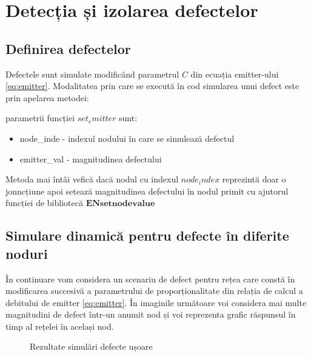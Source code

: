 \chapter{Detecția și izolarea defectelor}
\label{chap:detectie}
\section{Definirea defectelor}
Defectele sunt simulate modificând parametrul $C$ din ecuația emitter-ului \eqref{eq:emitter}. Modalitatea prin care se execută în cod simularea unui defect este prin apelarea metodei:



parametrii funcției $set_emitter$ sunt:
\begin{itemize}
\item node\_inde - indexul nodului în care se simulează defectul
\item emitter\_val - magnitudinea defectului
\end{itemize}

Metoda mai întâi vefică dacă nodul cu indexul $node_index$ reprezintă doar o jonncțiune apoi setează magnitudinea defectului în nodul primit cu ajutorul funcției de bibliotecă $\mathbf{ENsetnodevalue}$ 

\section{Simulare dinamică pentru defecte în diferite noduri}

În continuare vom considera un scenariu de defect pentru rețea care constă în modificarea succesivă a parametrului de proporționalitate din relația de calcul a debitului de emitter \eqref{eq:emitter}. În imaginile următoare voi considera mai multe magnitudini de defect într-un anumit nod și voi reprezenta grafic răspunsul în timp al rețelei în același nod.

\begin{figure}[H]

\qquad
{}

\caption{Rezultate simulări defecte ușoare}
\label{fig:ref_emitter_soft}
\end{figure}

